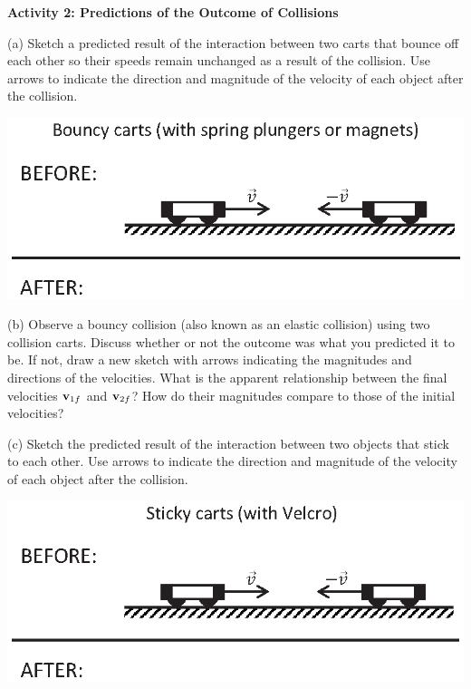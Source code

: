 \textbf{Activity 2: Predictions of the Outcome of Collisions }

(a) Sketch a predicted result of the interaction between two carts that bounce
off each other so their speeds remain unchanged as a result of the collision.
Use arrows to indicate the direction and magnitude of the velocity of each object after the collision.

{\par\centering \includegraphics{mom_cons/mom_cons_fig3_new.eps} \par}
\vspace{1cm}

(b) Observe a bouncy collision (also known as an elastic collision) using two collision carts. Discuss whether or not the outcome was what you predicted it to be. If not, draw a new sketch with arrows indicating the magnitudes and directions of the velocities. What is the apparent relationship between the final velocities \( {{\bf v}_{1f}} \) and \( {{\bf v}_{2f}} \)? How do their magnitudes compare to those of the initial velocities?
\answerspace{20mm}

\pagebreak[2]
(c) Sketch the predicted result of the interaction between two objects that
stick to each other. Use arrows to indicate the direction and magnitude of the velocity
of each object after the collision.

{\par\centering \includegraphics{mom_cons/mom_cons_fig4_new.eps} \par}
\vspace{1cm}

